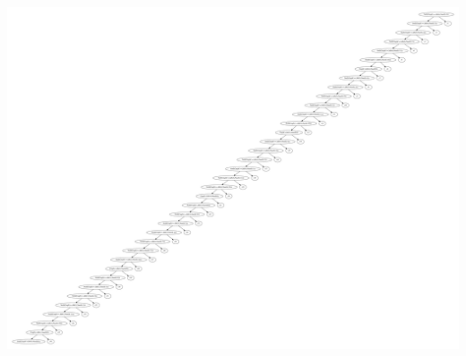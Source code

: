 \documentclass{beamer}
\begin{document}
\begin{frame}
  \includegraphics[height=\textheight,width=\textwidth,keepaspectratio,viewport=40in 30in 49in 37in]{iteration0}
\end{frame}
\end{document}
